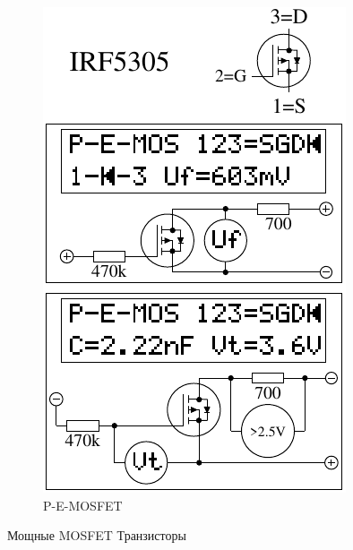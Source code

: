 \begin{figure}[H]
\begin{subfigure}[b]{.5\textwidth}
    \centering
    \includegraphics[width=1.\textwidth]{../FIG/MOS_IRF5305.pdf}
    \caption{P-E-MOSFET}
    \label{fig:MOS-P-E}
  \end{subfigure}
  \caption{Мощные MOSFET Транзисторы}
\end{figure}



